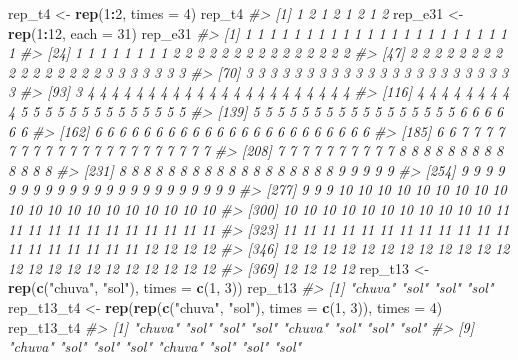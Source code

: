 \documentclass[]{book}
\newenvironment{Shaded}{\begin{snugshade}}{\end{snugshade}}
\newcommand{\KeywordTok}[1]{\textcolor[rgb]{0.13,0.29,0.53}{\textbf{#1}}}
\newcommand{\DataTypeTok}[1]{\textcolor[rgb]{0.13,0.29,0.53}{#1}}
\newcommand{\DecValTok}[1]{\textcolor[rgb]{0.00,0.00,0.81}{#1}}
\newcommand{\StringTok}[1]{\textcolor[rgb]{0.31,0.60,0.02}{#1}}
\newcommand{\CommentTok}[1]{\textcolor[rgb]{0.56,0.35,0.01}{\textit{#1}}}
\newcommand{\OperatorTok}[1]{\textcolor[rgb]{0.81,0.36,0.00}{\textbf{#1}}}
\newcommand{\NormalTok}[1]{#1}
\begin{document}
\begin{Shaded}
\begin{Highlighting}[]
\NormalTok{rep_t4 <-}\StringTok{ }\KeywordTok{rep}\NormalTok{(}\DecValTok{1}\OperatorTok{:}\DecValTok{2}\NormalTok{, }\DataTypeTok{times =} \DecValTok{4}\NormalTok{)}
\NormalTok{rep_t4}
\CommentTok{#> [1] 1 2 1 2 1 2 1 2}
\NormalTok{rep_e31 <-}\StringTok{ }\KeywordTok{rep}\NormalTok{(}\DecValTok{1}\OperatorTok{:}\DecValTok{12}\NormalTok{, }\DataTypeTok{each =} \DecValTok{31}\NormalTok{)}
\NormalTok{rep_e31}
\CommentTok{#>   [1]  1  1  1  1  1  1  1  1  1  1  1  1  1  1  1  1  1  1  1  1  1  1  1}
\CommentTok{#>  [24]  1  1  1  1  1  1  1  1  2  2  2  2  2  2  2  2  2  2  2  2  2  2  2}
\CommentTok{#>  [47]  2  2  2  2  2  2  2  2  2  2  2  2  2  2  2  2  3  3  3  3  3  3  3}
\CommentTok{#>  [70]  3  3  3  3  3  3  3  3  3  3  3  3  3  3  3  3  3  3  3  3  3  3  3}
\CommentTok{#>  [93]  3  4  4  4  4  4  4  4  4  4  4  4  4  4  4  4  4  4  4  4  4  4  4}
\CommentTok{#> [116]  4  4  4  4  4  4  4  4  4  5  5  5  5  5  5  5  5  5  5  5  5  5  5}
\CommentTok{#> [139]  5  5  5  5  5  5  5  5  5  5  5  5  5  5  5  5  5  6  6  6  6  6  6}
\CommentTok{#> [162]  6  6  6  6  6  6  6  6  6  6  6  6  6  6  6  6  6  6  6  6  6  6  6}
\CommentTok{#> [185]  6  6  7  7  7  7  7  7  7  7  7  7  7  7  7  7  7  7  7  7  7  7  7}
\CommentTok{#> [208]  7  7  7  7  7  7  7  7  7  7  8  8  8  8  8  8  8  8  8  8  8  8  8}
\CommentTok{#> [231]  8  8  8  8  8  8  8  8  8  8  8  8  8  8  8  8  8  8  9  9  9  9  9}
\CommentTok{#> [254]  9  9  9  9  9  9  9  9  9  9  9  9  9  9  9  9  9  9  9  9  9  9  9}
\CommentTok{#> [277]  9  9  9 10 10 10 10 10 10 10 10 10 10 10 10 10 10 10 10 10 10 10 10}
\CommentTok{#> [300] 10 10 10 10 10 10 10 10 10 10 10 11 11 11 11 11 11 11 11 11 11 11 11}
\CommentTok{#> [323] 11 11 11 11 11 11 11 11 11 11 11 11 11 11 11 11 11 11 11 12 12 12 12}
\CommentTok{#> [346] 12 12 12 12 12 12 12 12 12 12 12 12 12 12 12 12 12 12 12 12 12 12 12}
\CommentTok{#> [369] 12 12 12 12}
\NormalTok{rep_t13 <-}\StringTok{ }\KeywordTok{rep}\NormalTok{(}\KeywordTok{c}\NormalTok{(}\StringTok{"chuva"}\NormalTok{, }\StringTok{"sol"}\NormalTok{), }\DataTypeTok{times =} \KeywordTok{c}\NormalTok{(}\DecValTok{1}\NormalTok{, }\DecValTok{3}\NormalTok{))}
\NormalTok{rep_t13}
\CommentTok{#> [1] "chuva" "sol"   "sol"   "sol"}
\NormalTok{rep_t13_t4 <-}\StringTok{ }\KeywordTok{rep}\NormalTok{(}\KeywordTok{rep}\NormalTok{(}\KeywordTok{c}\NormalTok{(}\StringTok{"chuva"}\NormalTok{, }\StringTok{"sol"}\NormalTok{), }\DataTypeTok{times =} \KeywordTok{c}\NormalTok{(}\DecValTok{1}\NormalTok{, }\DecValTok{3}\NormalTok{)), }\DataTypeTok{times =} \DecValTok{4}\NormalTok{)}
\NormalTok{rep_t13_t4}
\CommentTok{#>  [1] "chuva" "sol"   "sol"   "sol"   "chuva" "sol"   "sol"   "sol"  }
\CommentTok{#>  [9] "chuva" "sol"   "sol"   "sol"   "chuva" "sol"   "sol"   "sol"}
\end{Highlighting}
\end{Shaded}
\end{document}
